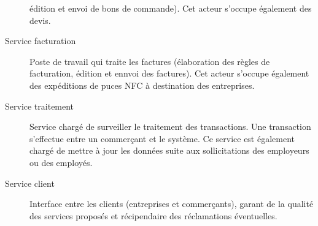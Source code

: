 \begin{description}
    édition et envoi de bons de commande). Cet acteur s’occupe également des
    devis.
  \item[Service facturation] Poste de travail qui traite les factures
    (élaboration des règles de facturation, édition et ennvoi des factures).
    Cet acteur s’occupe également des expéditions de puces NFC à destination
    des entreprises.
  \item[Service traitement] Service chargé de surveiller le traitement des
    transactions. Une transaction s’effectue entre un commerçant et le système.
    Ce service est également chargé de mettre à jour les données suite aux
    sollicitations des employeurs ou des employés.
  \item[Service client] Interface entre les clients (entreprises
    et commerçants), garant de la qualité des services proposés et récipendaire
    des réclamations éventuelles.
\end{description}



